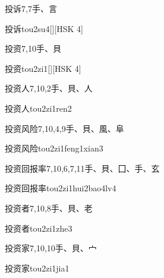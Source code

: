 \begin{entry}{投诉}{7,7}{⼿、⾔}
  \begin{phonetics}{投诉}{tou2su4}[][HSK 4]
  \end{phonetics}
\end{entry}

\begin{entry}{投资}{7,10}{⼿、⾙}
  \begin{phonetics}{投资}{tou2zi1}[][HSK 4]
  \end{phonetics}
\end{entry}

\begin{entry}{投资人}{7,10,2}{⼿、⾙、⼈}
  \begin{phonetics}{投资人}{tou2zi1ren2}
  \end{phonetics}
\end{entry}

\begin{entry}{投资风险}{7,10,4,9}{⼿、⾙、⾵、⾩}
  \begin{phonetics}{投资风险}{tou2zi1feng1xian3}
  \end{phonetics}
\end{entry}

\begin{entry}{投资回报率}{7,10,6,7,11}{⼿、⾙、⼞、⼿、⽞}
  \begin{phonetics}{投资回报率}{tou2zi1hui2bao4lv4}
  \end{phonetics}
\end{entry}

\begin{entry}{投资者}{7,10,8}{⼿、⾙、⽼}
  \begin{phonetics}{投资者}{tou2zi1zhe3}
  \end{phonetics}
\end{entry}

\begin{entry}{投资家}{7,10,10}{⼿、⾙、⼧}
  \begin{phonetics}{投资家}{tou2zi1jia1}
  \end{phonetics}
\end{entry}


